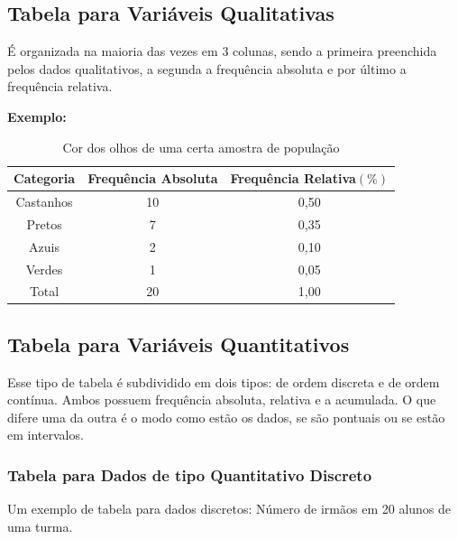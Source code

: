 \documentclass[
	12pt,				%
	oneside,			%
	a4paper,			%
	english,			%
	french,				%
	spanish,			%
	brazil,				%
	]{abntex2}
\begin{document}
\subsection{Tabela para Variáveis Qualitativas}

É organizada na maioria das vezes em 3 colunas, sendo a primeira preenchida pelos dados qualitativos, a segunda a frequência absoluta e por último a frequência relativa. \cite{dados}

\textbf{Exemplo:}

\begin{center}
\begin{table}[H]
\caption{Cor dos olhos de uma certa amostra de população}
\begin{center}
\begin{tabular}{c|c|c}

\hline
Categoria & Frequência Absoluta & Frequência Relativa$(\%)$ \\ 
\hline
Castanhos & 10 & 0,50 \\
\hline
Pretos & 7 & 0,35 \\
\hline
Azuis & 2 & 0,10 \\
\hline
Verdes & 1 & 0,05 \\
\hline
Total & 20 & 1,00 \\

\end{tabular}
\end{center}
\end{table}
\end{center}

\subsection{Tabela para Variáveis Quantitativos}

Esse tipo de tabela é subdividido em dois tipos: de ordem discreta e de ordem contínua. Ambos possuem frequência absoluta, relativa e a acumulada. O que difere uma da outra é o modo como estão os dados, se são pontuais ou se estão em intervalos.

\subsubsection{Tabela para Dados de tipo Quantitativo Discreto}

Um exemplo de tabela para dados discretos: Número de irmãos em 20 alunos de uma turma.
\end{document}
